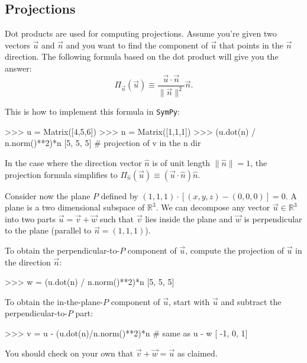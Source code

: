 	

\vspace{-4mm}

	
\subsection{Projections}
\label{vectors:projections}

\vspace{-2mm}

Dot products are used for computing projections.
Assume you're given two vectors $\vec{u}$ and $\vec{n}$ and you want to find the component
of $\vec{u}$ that points in the $\vec{n}$ direction.
The following formula based on the dot product will give you the answer:
\[
 \Pi_{\vec{n}}( \vec{u} ) \equiv \frac{  \vec{u} \cdot \vec{n}  }{ \| \vec{n} \|^2 } \vec{n}.
\]

\vspace{-2mm}

\noindent
This is how to implement this formula in \texttt{SymPy}:
\small
\begin{verbatimtab}
>>> u = Matrix([4,5,6])
>>> n = Matrix([1,1,1])
>>> (u.dot(n) / n.norm()**2)*n
[5, 5, 5]                      # projection of v in the n dir
\end{verbatimtab}
\normalsize

\noindent
In the case where the direction vector $\hat{n}$ is of unit length $\|\hat{n}\| = 1$,
the projection formula simplifies to $\Pi_{\hat{n}}( \vec{u} ) \equiv (\vec{u}\cdot\hat{n})\hat{n}$.


Consider now the plane $P$ defined by $(1,1,1)\cdot[(x,y,z)-(0,0,0)]=0$.
A plane is a two dimensional subspace of $\mathbb{R}^3$.
We can decompose any vector $\vec{u} \in \mathbb{R}^3$ into two parts $\vec{u}=\vec{v} + \vec{w}$
such that $\vec{v}$ lies inside the plane and $\vec{w}$ is perpendicular to the plane (parallel to $\vec{n}=(1,1,1)$).

To obtain the perpendicular-to-$P$ component of $\vec{u}$,
compute the projection of $\vec{u}$ in the direction $\vec{n}$:
\small
\begin{verbatimtab}
>>> w = (u.dot(n) / n.norm()**2)*n
[5, 5, 5]
\end{verbatimtab}
\normalsize

\noindent
To obtain the in-the-plane-$P$ component of $\vec{u}$,
start with $\vec{u}$ and subtract the perpendicular-to-$P$ part:
\small
\begin{verbatimtab}
>>> v = u - (u.dot(n)/n.norm()**2)*n      # same as u - w
[ -1, 0, 1]
\end{verbatimtab}
\normalsize

\noindent
You should check on your own that $\vec{v}+\vec{w}=\vec{u}$ as claimed.

\vspace{-5mm}
